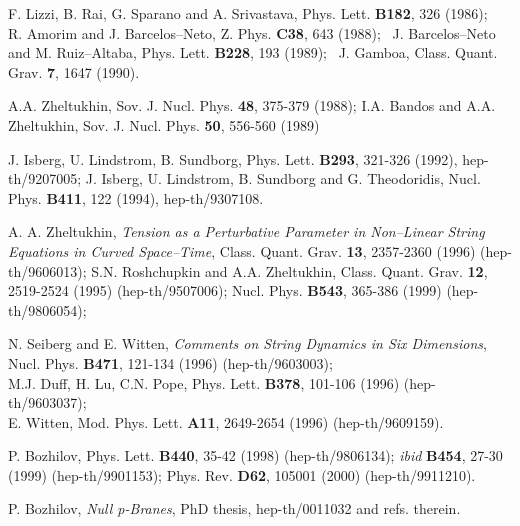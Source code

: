 \documentclass[a4paper,11pt]{article}
\begin{document}
{\begin{thebibliography}{99}
F. Lizzi, B. Rai, G. Sparano and A. Srivastava, Phys. Lett. 
{\bf B182}, 326 (1986); \, R. Amorim and J. Barcelos--Neto, 
Z. Phys. {\bf C38}, 643 (1988); \, J. Barcelos--Neto and M. Ruiz--Altaba, 
  Phys. Lett. {\bf B228}, 193 (1989); \,  
J. Gamboa, Class. Quant. Grav. {\bf 7}, 1647 (1990).


A.A. Zheltukhin, 
Sov. J. Nucl. Phys. {\bf 48}, 375-379 (1988); 
I.A. Bandos and A.A. Zheltukhin, 
Sov. J. Nucl. Phys. {\bf 50}, 556-560 (1989) 



J. Isberg, U. Lindstrom, B. Sundborg, 
Phys. Lett. {\bf B293}, 321-326 (1992), hep-th/9207005;  
J. Isberg, U. Lindstrom, B. Sundborg and G. Theodoridis, 
Nucl. Phys. {\bf B411}, 122 (1994), hep-th/9307108. 

 A. A. Zheltukhin, {\sl Tension as a Perturbative Parameter in 
Non--Linear String Equations in Curved Space--Time}, 
Class. Quant. Grav. {\bf 13}, 2357-2360 (1996) (hep-th/9606013); 
 S.N. Roshchupkin and A.A. Zheltukhin, 
Class. Quant. Grav. {\bf 12}, 2519-2524  (1995) 
(hep-th/9507006); 
Nucl. Phys. {\bf B543}, 365-386 (1999) (hep-th/9806054); 


N. Seiberg and E. Witten, 
{\sl Comments on String Dynamics in Six Dimensions}, 
Nucl. Phys. {\bf B471}, 121-134 (1996) (hep-th/9603003);   
\\ M.J. Duff, H. Lu, C.N. Pope, 
 Phys. Lett. {\bf B378}, 101-106 (1996) (hep-th/9603037); 
 \\ E. Witten, 
Mod. Phys. Lett. {\bf A11}, 2649-2654 (1996) (hep-th/9609159). 


P. Bozhilov, 
Phys. Lett. {\bf B440}, 35-42 (1998) (hep-th/9806134);  {\it ibid} 
{\bf B454}, 27-30 (1999) (hep-th/9901153);  
Phys. Rev. {\bf D62}, 105001 (2000) (hep-th/9911210).

 P. Bozhilov, 
{\sl Null p-Branes}, PhD thesis, hep-th/0011032 and refs. therein. 


\end{thebibliography}}
\end{document}
